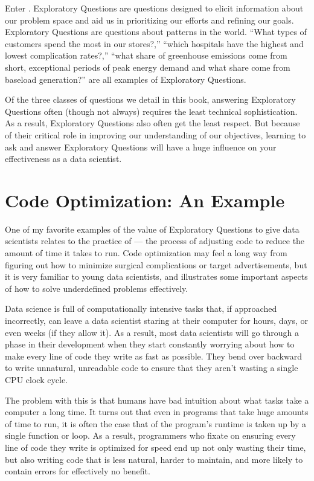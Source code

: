 \documentclass[letterpaper,10pt,english]{jupyterBook}
\begin{document}
\sphinxAtStartPar
Enter . Exploratory Questions are questions designed to elicit information about our problem space and aid us in prioritizing our efforts and refining our goals. Exploratory Questions are questions about patterns in the world. “What types of customers spend the most in our stores?,” “which hospitals have the highest and lowest complication rates?,” “what share of greenhouse emissions come from short, exceptional periods of peak energy demand and what share come from baseload generation?” are all examples of Exploratory Questions.

\sphinxAtStartPar
Of the three classes of questions we detail in this book, answering Exploratory Questions often (though not always) requires the least technical sophistication. As a result, Exploratory Questions also often get the least respect. But because of their critical role in improving our understanding of our objectives, learning to ask and answer Exploratory Questions will have a huge influence on your effectiveness as a data scientist.


\section{Code Optimization: An Example}
\label{\detokenize{30_questions/10_using_exploratory_questions:code-optimization-an-example}}
\sphinxAtStartPar
One of my favorite examples of the value of Exploratory Questions to give data scientists relates to the practice of  — the process of adjusting code to reduce the amount of time it takes to run. Code optimization may feel a long way from figuring out how to minimize surgical complications or target advertisements, but it is very familiar to young data scientists, and illustrates some important aspects of how to solve underdefined problems effectively.

\sphinxAtStartPar
Data science is full of computationally intensive tasks that, if approached incorrectly, can leave a data scientist staring at their computer for hours, days, or even weeks (if they allow it). As a result, most data scientists will go through a phase in their development when they start constantly worrying about how to make every line of code they write as fast as possible. They bend over backward to write unnatural, unreadable code to ensure that they aren’t wasting a single CPU clock cycle.

\sphinxAtStartPar
The problem with this is that humans have  bad intuition about what tasks take a computer a long time. It turns out that even in programs that take huge amounts of time to run, it is often the case that  of the program’s runtime is taken up by a single function or loop. As a result, programmers who fixate on ensuring every line of code they write is optimized for speed end up not only wasting their  time, but also writing code that is less natural, harder to maintain, and more likely to contain errors for effectively no benefit.
\end{document}
